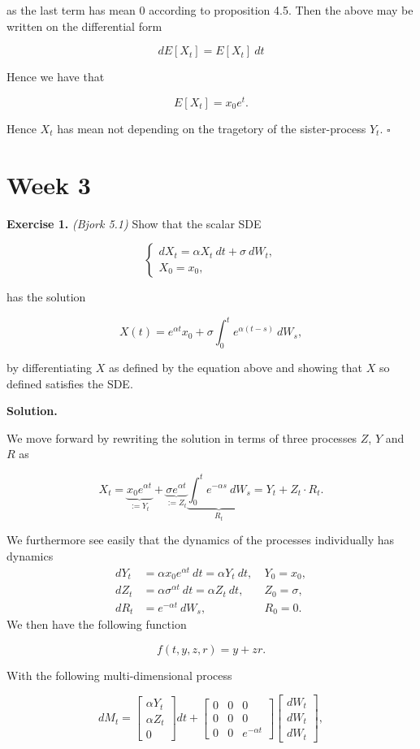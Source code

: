 \documentclass[a4paper,12pt,openany]{book}
\begin{document}
as the last term has mean 0 according to proposition 4.5. Then the above may be written on the differential form

\[
dE[X_t]=E[X_t]\ dt
\]

Hence we have that

\[
E[X_t]=x_0e^{t}.
\]

Hence \(X_t\) has mean not depending on the tragetory of the sister-process \(Y_t\). \(\square\)

\hypertarget{week-3}{%
\section{Week 3}\label{week-3}}

\textbf{Exercise 1.} \emph{(Bjork 5.1)} Show that the scalar SDE

\[
\left\{
\begin{matrix}
dX_t=\alpha X_t\ dt + \sigma\ dW_t,\\
X_0 = x_0,
\end{matrix}\right.
\]

has the solution

\[
X(t)=e^{\alpha t}x_0+ \sigma\int_0^te^{\alpha(t-s)}\ dW_s,
\]

by differentiating \(X\) as defined by the equation above and showing that \(X\) so defined satisfies the SDE.

\textbf{Solution.}

We move forward by rewriting the solution in terms of three processes \(Z\), \(Y\) and \(R\) as

\[
X_t=\underbrace{x_0e^{\alpha t}}_{:=Y_t}+\underbrace{\sigma e^{\alpha t}}_{:=Z_t} \underbrace{\int_0^t e^{-\alpha s}\ dW_s}_{R_t}=Y_t+Z_t\cdot R_t.
\]

We furthermore see easily that the dynamics of the processes individually has dynamics
\begin{align*}
d Y_t&=\alpha x_0e^{\alpha t}\ dt=\alpha Y_t\ dt,\ &Y_0=x_0,\\
d Z_t&=\alpha \sigma^{\alpha t}\ dt=\alpha Z_t\ dt,\ &Z_0=\sigma,\\
d R_t&=e^{-\alpha t}\ dW_s,\ &R_0=0.
\end{align*}
We then have the following function

\[
f\left(t,y,z,r\right)=y+zr.
\]

With the following multi-dimensional process

\[
dM_t=\begin{bmatrix}\alpha Y_t\\ \alpha Z_t\\ 0\end{bmatrix}dt+\begin{bmatrix}0 &0  &0 \\ 0 & 0 &0 \\ 0 & 0 & e^{-\alpha t}\end{bmatrix}\begin{bmatrix}dW_t\\ dW_t\\ dW_t\end{bmatrix},
\]
\end{document}

